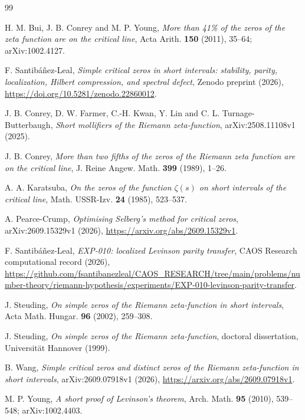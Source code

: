 \documentclass[11pt]{article}
\theoremstyle{remark}
\begin{document}
\begin{thebibliography}{99}
\raggedright

H. M. Bui, J. B. Conrey and M. P. Young,
\emph{More than 41\% of the zeros of the zeta function are on the critical
line}, Acta Arith. \textbf{150} (2011), 35--64; arXiv:1002.4127.

F. Santib\'a\~nez-Leal,
\emph{Simple critical zeros in short intervals: stability, parity,
localization, Hilbert compression, and spectral defect},
Zenodo preprint (2026),
\url{https://doi.org/10.5281/zenodo.22860012}.

J. B. Conrey, D. W. Farmer, C.-H. Kwan, Y. Lin and
C. L. Turnage-Butterbaugh,
\emph{Short mollifiers of the Riemann zeta-function},
arXiv:2508.11108v1 (2025).

J. B. Conrey,
\emph{More than two fifths of the zeros of the Riemann zeta function are on
the critical line}, J. Reine Angew. Math. \textbf{399} (1989), 1--26.

A. A. Karatsuba,
\emph{On the zeros of the function $\zeta(s)$ on short intervals of the
critical line}, Math. USSR-Izv. \textbf{24} (1985), 523--537.

A. Pearce-Crump,
\emph{Optimising Selberg's method for critical zeros},
arXiv:2609.15329v1 (2026),
\url{https://arxiv.org/abs/2609.15329v1}.

F. Santib\'a\~nez-Leal,
\emph{EXP-010: localized Levinson parity transfer},
CAOS Research computational record (2026),
\url{https://github.com/fsantibanezleal/CAOS_RESEARCH/tree/main/problems/number-theory/riemann-hypothesis/experiments/EXP-010-levinson-parity-transfer}.

J. Steuding,
\emph{On simple zeros of the Riemann zeta-function in short intervals},
Acta Math. Hungar. \textbf{96} (2002), 259--308.

J. Steuding,
\emph{On simple zeros of the Riemann zeta-function},
doctoral dissertation, Universit\"at Hannover (1999).

B. Wang,
\emph{Simple critical zeros and distinct zeros of the Riemann zeta-function
in short intervals},
arXiv:2609.07918v1 (2026),
\url{https://arxiv.org/abs/2609.07918v1}.

M. P. Young,
\emph{A short proof of Levinson's theorem},
Arch. Math. \textbf{95} (2010), 539--548; arXiv:1002.4403.

\end{thebibliography}
\end{document}
